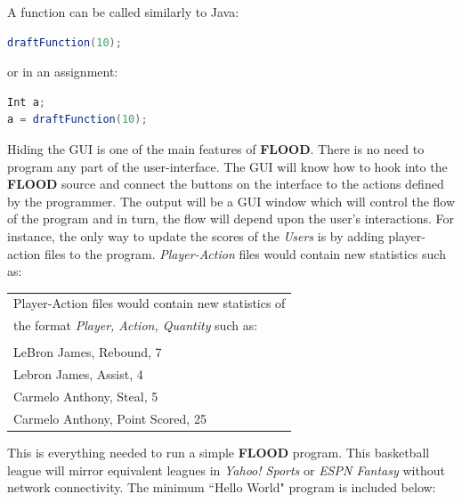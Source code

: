 \documentclass[12pt]{report}
\begin{document}
A function can be called similarly to Java:

\begin{singlespace}
\begin{lstlisting}[language=Java,label=some-code,caption={Function call.}]
draftFunction(10);
\end{lstlisting}
\end{singlespace}

or in an assignment:

\begin{singlespace}
\begin{lstlisting}[language=Java,label=some-code,caption={Function call in an assignment.}]
Int a;
a = draftFunction(10);
\end{lstlisting}
\end{singlespace}

Hiding the GUI is one of the main features of \textbf{FLOOD}. There is no need to program any part of the user-interface. The GUI will know how to hook into the \textbf{FLOOD} source and connect the buttons on the interface to the actions defined by the programmer. The output will be a GUI window which will control the flow of the program and in turn, the flow will depend upon the user's interactions. For instance, the only way to update the scores of the \textit{Users} is by adding player-action files to the program. \textit{Player-Action} files would contain new statistics such as:
\begin{center}
\begin{singlespace}
\begin{tabular}{ l }
Player-Action files would contain new statistics of\\
the format \textit{Player, Action, Quantity} such as:\\
\\
LeBron James, Rebound, 7 \\
Lebron James, Assist, 4  \\
Carmelo Anthony, Steal, 5 \\
Carmelo Anthony, Point Scored, 25
\end{tabular}
\end{singlespace}
\end{center}

This is everything needed to run a simple \textbf{FLOOD} program. This basketball league will mirror equivalent leagues in \textit{Yahoo! Sports} or \textit{ESPN Fantasy} without network connectivity. The minimum ``Hello World" program is included below:
\end{document}
